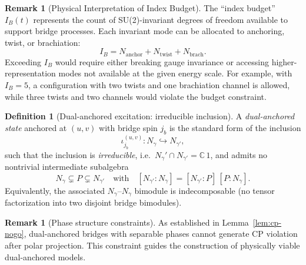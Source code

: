 \documentclass[11pt]{article}
\newcommand{\Index}[2]{\left[#1:#2\right]}
\theoremstyle{plain}
\theoremstyle{definition}
\newtheorem{definition}[theorem]{Definition}
\newtheorem{remark}[theorem]{Remark}
\begin{document}
\begin{remark}[Physical Interpretation of Index Budget]
  The ``index budget'' $I_B(t)$ represents the count of SU(2)-invariant degrees of freedom available to support bridge processes. Each invariant mode can be allocated to anchoring, twist, or brachiation:
  \begin{equation}
    I_B = N_{\text{anchor}} + N_{\text{twist}} + N_{\text{brach}}.
  \end{equation}
  Exceeding $I_B$ would require either breaking gauge invariance or accessing higher-representation modes not available at the given energy scale. For example, with $I_B=5$, a configuration with two twists and one brachiation channel is allowed, while three twists and two channels would violate the budget constraint.
\end{remark}

\begin{definition}[Dual-anchored excitation: irreducible inclusion]\label{def:dual-anchored-irreducible}
  A \emph{dual-anchored state} anchored at $(u,v)$ with bridge spin $j_b$ is the standard form of the inclusion
  \[
    \iota^{(u,v)}_{j_b}: N_\gamma \hookrightarrow N_{\gamma'} ,
  \]
  such that the inclusion is \emph{irreducible}, i.e.\ $N_\gamma' \cap N_{\gamma'} = \mathbb{C}\,1$, and admits no nontrivial intermediate subalgebra
  \[
    N_\gamma \subsetneq P \subsetneq N_{\gamma'} \quad\text{with}\quad \Index{N_{\gamma'}}{N_\gamma} = \Index{N_{\gamma'}}{P}\,\Index{P}{N_\gamma}.
  \]
  Equivalently, the associated $N_\gamma$–$N_\gamma$ bimodule is indecomposable (no tensor factorization into two disjoint bridge bimodules).
\end{definition}

\begin{remark}[Phase structure constraints]
  As established in Lemma~\ref{lem:cp-nogo}, dual-anchored bridges with separable phases cannot generate CP violation after polar projection. This constraint guides the construction of physically viable dual-anchored models.
\end{remark}
\end{document}
